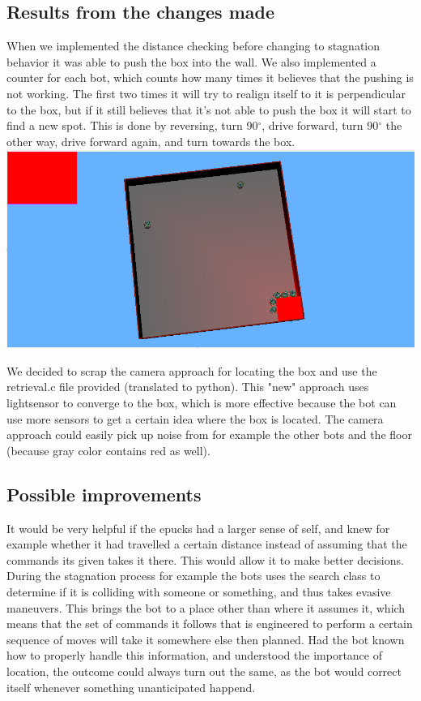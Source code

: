 \documentclass[12pt, a4paper]{article}
\begin{document}
\subsection{Results from the changes made}
When we implemented the distance checking before changing to stagnation behavior it was able to push the box into the wall. We also implemented a counter for each bot, which counts how many times it believes that the pushing is not working. The first two times it will try to realign itself to it is perpendicular to the box, but if it still believes that it's not able to push the box it will start to find a new spot. This is done by reversing, turn 90$^{\circ}$, drive forward, turn 90$^{\circ}$ the other way, drive forward again, and turn towards the box. \\
\includegraphics[width=\linewidth]{1.finalState}

We decided to scrap the camera approach for locating the box and use the retrieval.c file provided (translated to python). This "new" approach uses lightsensor to converge to the box, which is more effective because the bot can use more sensors to get a certain idea where the box is located. The camera approach could easily pick up noise from for example the other bots and the floor (because gray color contains red as well).

\subsection{Possible improvements}
It would be very helpful if the epucks had a larger sense of self, and knew for example whether it had travelled a certain distance instead of assuming that the commands its given takes it there. This would allow it to make better decisions. During the stagnation process for example the bots uses the search class to determine if it is colliding with someone or something, and thus takes evasive maneuvers. This brings the bot to a place other than where it assumes it, which means that the set of commands it follows that is engineered to perform a certain sequence of moves will take it somewhere else then planned. Had the bot known how to properly handle this information, and understood the importance of location, the outcome could always turn out the same, as the bot would correct itself whenever something unanticipated happend. 
\end{document}
